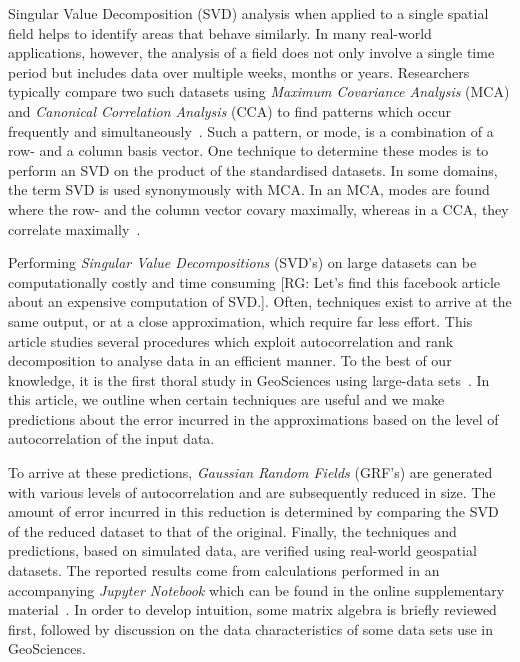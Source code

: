 \documentclass[ijgi,article,submit,moreauthors,pdftex,10pt,a4paper]{Definitions/mdpi}
\begin{document}
Singular Value Decomposition (SVD) analysis when applied to a single spatial field helps to identify areas that behave similarly. In many real-world applications, however, the analysis of a field does not only involve a single time period but includes data over multiple weeks, months or years. Researchers typically compare two such datasets using \textit{Maximum Covariance Analysis} (MCA) and \textit{Canonical Correlation Analysis} (CCA) to find patterns which occur frequently and simultaneously~\cite{Eshel2011, Storch1999}. Such a pattern, or mode, is a combination of a row- and a column basis vector. One technique to determine these modes is to perform an SVD on the product of the standardised datasets. In some domains, the term SVD is used synonymously with MCA. In an MCA, modes are found where the row- and the column vector covary maximally, whereas in a CCA, they correlate maximally~\cite{Bretherton1992}.

Performing \textit{Singular Value Decompositions} (SVD's) on large datasets can be computationally costly and time consuming [RG: Let's find this facebook article about an expensive computation of SVD.]. Often, techniques exist to arrive at the same output, or at a close approximation, which require far less effort. This article studies several procedures which exploit autocorrelation and rank decomposition to analyse data in an efficient manner. To the best of our knowledge, it is the first thoral study in GeoSciences using large-data sets~\cite{Golub1970, Bjorck1973, Chan1982}. In this article, we outline when certain techniques are useful and we make predictions about the error incurred in the approximations based on the level of autocorrelation of the input data.

To arrive at these predictions, \textit{Gaussian Random Fields} (GRF's) are generated with various levels of autocorrelation and are subsequently reduced in size. The amount of error incurred in this reduction is determined by comparing the SVD of the reduced dataset to that of the original. Finally, the techniques and predictions, based on simulated data, are verified using real-world geospatial datasets. The reported results come from calculations performed in an accompanying \textit{Jupyter Notebook} which can be found in the online supplementary material~\cite{Bogaardt2018}. In order to develop intuition, some matrix algebra is briefly reviewed first, followed by discussion on the data characteristics of some data sets use in GeoSciences.

\end{document}
